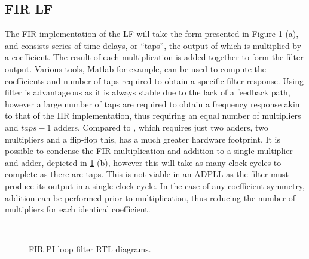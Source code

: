 \subsection{\acs{FIR} \acl{LF}}
The \acl{FIR} implementation of the \acl{LF} will take the form presented in Figure \ref{fig:fir_pi} (a), and consists series of time delays, or ``taps'', the output of which is multiplied by a coefficient. The result of each multiplication is added together to form the filter output. Various tools, Matlab for example, can be used to compute the coefficients and number of taps required to obtain a specific filter response. Using  filter is advantageous as it is always stable due to the lack of a feedback path, however a large number of taps are required to obtain a frequency response akin to that of the \ac{IIR} implementation, thus requiring an equal number of multipliers and $taps-1$ adders. Compared to , which requires just two adders, two multipliers and a flip-flop this, has a much greater hardware footprint. It is possible to condense the \ac{FIR} multiplication and addition to a single multiplier and adder, depicted in \ref{fig:fir_pi} (b), however this will take as many clock cycles to complete as there are taps. This is not viable in an \ac{ADPLL} as the filter must produce its output in a single clock cycle. In the case of any coefficient symmetry, addition can be performed prior to multiplication, thus reducing the number of multipliers for each identical coefficient.
\begin{figure}[h]
	\centering
	\\
	\caption[\acs{FIR} \acs{PI} loop filter RTL diagrams]{\acs{FIR} \acs{PI} loop filter RTL diagrams.}
	\label{fig:fir_pi}
\end{figure}

